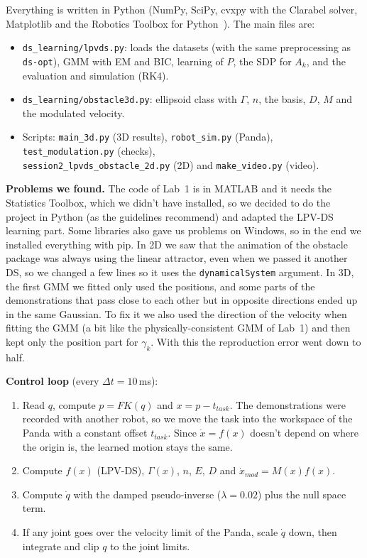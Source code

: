 ﻿\documentclass[10pt,a4paper]{article}
\begin{document}
Everything is written in Python (NumPy, SciPy, cvxpy with the Clarabel solver, Matplotlib and the
Robotics Toolbox for Python~\cite{rtb}). The main files are:
\begin{itemize}
\item \texttt{ds\_learning/lpvds.py}: loads the datasets (with the same preprocessing as \texttt{ds-opt}),
GMM with EM and BIC, learning of $P$, the SDP for $A_k$, and the evaluation and simulation (RK4).
\item \texttt{ds\_learning/obstacle3d.py}: ellipsoid class with $\Gamma$, $n$, the basis, $D$, $M$ and
the modulated velocity.
\item Scripts: \texttt{main\_3d.py} (3D results), \texttt{robot\_sim.py} (Panda), \texttt{test\_modulation.py}
(checks),\\ \texttt{session2\_lpvds\_obstacle\_2d.py} (2D) and \texttt{make\_video.py} (video).
\end{itemize}

\textbf{Problems we found.} The code of Lab~1 is in MATLAB and it needs the Statistics Toolbox,
which we didn't have installed, so we decided to do the project in Python (as the guidelines
recommend) and adapted the LPV-DS learning part. Some libraries also gave us problems on Windows,
so in the end we installed everything with pip. In 2D we saw that the animation of the obstacle
package was always using the linear attractor, even when we passed it another DS, so we changed a
few lines so it uses the \texttt{dynamicalSystem} argument. In 3D, the first GMM we fitted only used
the positions, and some parts of the demonstrations that pass close to each other but in opposite
directions ended up in the same Gaussian. To fix it we also used the direction of the velocity when
fitting the GMM (a bit like the physically-consistent GMM of Lab~1) and then kept only the position
part for $\gamma_k$. With this the reproduction error went down to half.

\textbf{Control loop} (every $\Delta t=10$\,ms):
\begin{enumerate}
\item Read $q$, compute $p=FK(q)$ and $x=p-t_{task}$. The demonstrations were recorded with another
robot, so we move the task into the workspace of the Panda with a constant offset $t_{task}$. Since
$\dot x=f(x)$ doesn't depend on where the origin is, the learned motion stays the same.
\item Compute $f(x)$ (LPV-DS), $\Gamma(x)$, $n$, $E$, $D$ and $\dot x_{mod}=M(x)f(x)$.
\item Compute $\dot q$ with the damped pseudo-inverse ($\lambda=0.02$) plus the null space term.
\item If any joint goes over the velocity limit of the Panda, scale $\dot q$ down, then integrate and
clip $q$ to the joint limits.
\end{enumerate}
\end{document}
